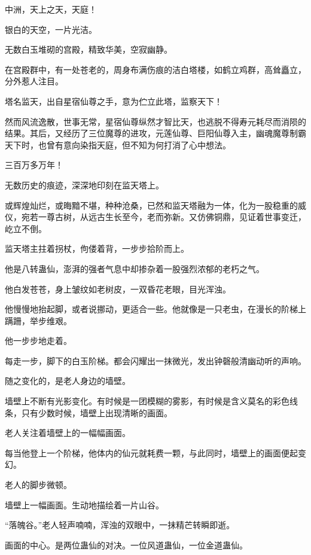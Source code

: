 
\begin{this_body}



中洲，天上之天，天庭！

银白的天空，一片光洁。

无数白玉堆砌的宫殿，精致华美，空寂幽静。

在宫殿群中，有一处苍老的，周身布满伤痕的洁白塔楼，如鹤立鸡群，高耸矗立，分外惹人注目。

塔名监天，出自星宿仙尊之手，意为伫立此塔，监察天下！

然而风流逸散，世事无常，星宿仙尊纵然才智比天，也逃脱不得寿元耗尽而消陨的结果。其后，又经历了三位魔尊的进攻，元莲仙尊、巨阳仙尊入主，幽魂魔尊制霸天下时，也曾有意向染指天庭，但不知为何打消了心中想法。

三百万多万年！

无数历史的痕迹，深深地印刻在监天塔上。

或辉煌灿烂，或晦黯不堪，种种沧桑，已然和监天塔融为一体，化为一股稳重的威仪，宛若一尊古树，从远古生长至今，老而弥新。又仿佛铜鼎，见证着世事变迁，屹立不倒。

监天塔主拄着拐杖，佝偻着背，一步步拾阶而上。

他是八转蛊仙，澎湃的强者气息中却掺杂着一股强烈浓郁的老朽之气。

他白发苍苍，身上皱纹如老树皮，一双昏花老眼，目光浑浊。

他慢慢地抬起脚，或者说挪动，更适合一些。他就像是一只老虫，在漫长的阶梯上蹒跚，举步维艰。

他一步步地走着。

每走一步，脚下的白玉阶梯。都会闪耀出一抹微光，发出钟磬般清幽动听的声响。

随之变化的，是老人身边的墙壁。

墙壁上不断有光影变化。有时候是一团模糊的雾影，有时候是含义莫名的彩色线条，只有少数时候，墙壁上出现清晰的画面。

老人关注着墙壁上的一幅幅画面。

每当他登上一个阶梯，他体内的仙元就耗费一颗，与此同时，墙壁上的画面便起变幻。

老人的脚步微顿。

墙壁上一幅画面。生动地描绘着一片山谷。

“落魄谷。”老人轻声喃喃，浑浊的双眼中，一抹精芒转瞬即逝。

画面的中心。是两位蛊仙的对决。一位风道蛊仙，一位金道蛊仙。


\end{this_body}
